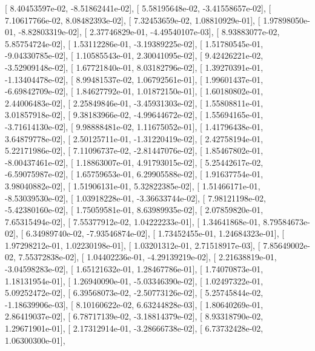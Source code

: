 \documentclass{article}
\begin{document}
       [  8.40453597e-02,  -8.51862441e-02],
       [  5.58195648e-02,  -3.41558657e-02],
       [  7.10617766e-02,   8.08482393e-02],
       [  7.32453659e-02,   1.08810929e-01],
       [  1.97898050e-01,  -8.82803319e-02],
       [  2.37746829e-01,  -4.49540107e-03],
       [  8.93883077e-02,   5.85754724e-02],
       [  1.53112286e-01,  -3.19389225e-02],
       [  1.51780545e-01,  -9.04330785e-02],
       [  1.10585543e-01,   2.30041095e-02],
       [  9.42426221e-02,  -3.52909148e-02],
       [  1.67721840e-01,   8.03182796e-02],
       [  1.39270391e-01,  -1.13404478e-02],
       [  8.99481537e-02,   1.06792561e-01],
       [  1.99601437e-01,  -6.69842709e-02],
       [  1.84627792e-01,   1.01872150e-01],
       [  1.60180802e-01,   2.44006483e-02],
       [  2.25849846e-01,  -3.45931303e-02],
       [  1.55808811e-01,   3.01857918e-02],
       [  9.38183966e-02,  -4.99644672e-02],
       [  1.55694165e-01,  -3.71614130e-02],
       [  9.98888481e-02,   1.11675052e-01],
       [  1.41796438e-01,   3.64879778e-02],
       [  2.50125711e-01,  -1.31220419e-02],
       [  2.42758194e-01,   5.22171986e-02],
       [  7.11096737e-02,  -2.81447076e-02],
       [  1.85467802e-01,  -8.00437461e-02],
       [  1.18863007e-01,   4.91793015e-02],
       [  5.25442617e-02,  -6.59075987e-02],
       [  1.65759653e-01,   6.29905588e-02],
       [  1.91637754e-01,   3.98040882e-02],
       [  1.51906131e-01,   5.32822385e-02],
       [  1.51466171e-01,  -8.53039530e-02],
       [  1.03918228e-01,  -3.36633744e-02],
       [  7.98121198e-02,  -5.42380160e-02],
       [  1.75059581e-01,   8.63989935e-02],
       [  2.07859820e-01,   7.65315494e-02],
       [  7.55377912e-02,   1.04222233e-01],
       [  1.34641868e-01,   8.79584673e-02],
       [  6.34989740e-02,  -7.93546874e-02],
       [  1.73452455e-01,   1.24684323e-01],
       [  1.97298212e-01,   1.02230198e-01],
       [  1.03201312e-01,   2.71518917e-03],
       [  7.85649002e-02,   7.55372838e-02],
       [  1.04402236e-01,  -4.29139219e-02],
       [  2.21638819e-01,  -3.04598283e-02],
       [  1.65121632e-01,   1.28467786e-01],
       [  1.74070873e-01,   1.18131954e-01],
       [  1.26940090e-01,  -5.03346390e-02],
       [  1.02497322e-01,   5.09252472e-02],
       [  6.39568073e-02,  -2.50773126e-02],
       [  5.25745844e-02,  -1.18639906e-03],
       [  8.10160622e-02,   6.63244828e-03],
       [  1.80640269e-01,   2.86419037e-02],
       [  6.78717139e-02,  -3.18814379e-02],
       [  8.93318790e-02,   1.29671901e-01],
       [  2.17312914e-01,  -3.28666738e-02],
       [  6.73732428e-02,   1.06300300e-01],
\end{document}
